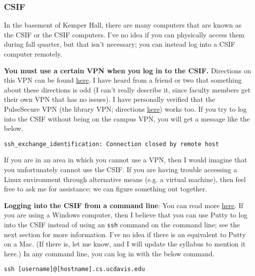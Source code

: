 \documentclass{article}
\begin{document}
\subsubsection{CSIF}

In the basement of Kemper Hall, there are many computers that are known as the CSIF or the CSIF computers. I've no idea if you can physically access them during fall quarter, but that isn't necessary; you can instead log into a CSIF computer remotely.

\textbf{You must use a certain VPN when you log in to the CSIF.} Directions on this VPN can be found \href{http://csifdocs.cs.ucdavis.edu/news/vpnrequiredtoconnecttocsifcomputers}{here}. I have heard from a friend or two that something about these directions is odd (I can't really describe it, since faculty members get their own VPN that has no issues). I have personally verified that the PulseSecure VPN (the library VPN; directions \href{https://www.library.ucdavis.edu/service/connect-from-off-campus/}{here}) works too. If you try to log into the CSIF without being on the campus VPN, you will get a message like the below.

\begin{lstlisting}
ssh_exchange_identification: Connection closed by remote host
\end{lstlisting}

If you are in an area in which you cannot use a VPN, then I would imagine that you unfortunately cannot use the CSIF. If you are having trouble accessing a Linux environment through alternative means (e.g. a virtual machine), then feel free to ask me for assistance; we can figure something out together.

\textbf{Logging into the CSIF from a command line}: You can read more \href{http://csifdocs.cs.ucdavis.edu/about-us/csif-general-faq#TOC-Can-I-remotely-login-to-the-CSIF-computers-}{here}. If you are using a Windows computer, then I believe that you can use Putty to log into the CSIF instead of using an \lstinline{ssh} command on the command line; see the next section for more information. I've no idea if there is an equivalent to Putty on a Mac. (If there is, let me know, and I will update the syllabus to mention it here.) In any command line, you can log in with the below command.

\begin{lstlisting}
ssh [username]@[hostname].cs.ucdavis.edu
\end{lstlisting}
\end{document}
